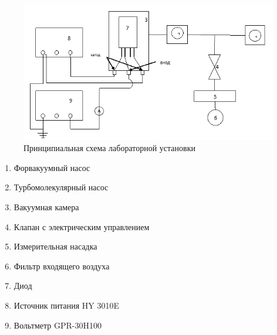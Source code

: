 \documentclass[a4paper]{article}
\begin{document}
\begin{figure}[h]
    \centering
    \includegraphics[width=13cm]{setup.PNG}
    \caption{Принципиальная схема лабораторной установки}
    \label{fig:vac}
\end{figure}
\begin{enumerate}
    \item Форвакуумный насос
\item Турбомолекулярный насос
\item Вакуумная камера
\item Клапан с электрическим управлением
\item Измерительная насадка
\item Фильтр входящего воздуха
\item Диод
\item Источник питания HY 3010E
\item Вольтметр GPR-30H100
\end{enumerate}
\end{document}
